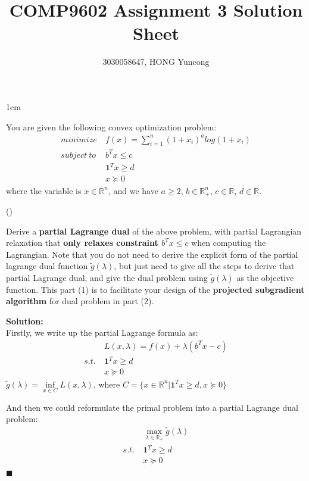 \documentclass{article}
\newcounter{pcounter}                                   %
\newenvironment{problem}                                %
{                                                       %
    \stepcounter{pcounter}                              %
    (\arabic{pcounter})                                 %
}{}                                                     %
\newenvironment{solution}                               %
{\textbf{Solution:} \\}{$\blacksquare$\newline}         %
\newcommand{\domR}{\mathbb{R}}                          %
\newcommand{\vecOne}{\textbf{1}}                        %
\begin{document}
\parindent 0in
\parskip 1em
\title{COMP9602 Assignment 3 Solution Sheet}
\author{3030058647, HONG Yuncong}
\maketitle

You are given the following convex optimization problem:
\begin{align*}
    minimize\ &f(x) = \sum_{i=1}^n (1+x_i)^a log(1+x_i) \\
    subject\ to \ 
        &b^T x \leq c \\
        &\vecOne^T x \geq d \\
        &x \succeq 0
\end{align*}
where the variable is $x \in \domR^n$, and we have $a \geq 2$, $b \in \domR_+^n$, $c \in \domR$, $d \in \domR$.

\begin{problem}
    Derive a \textbf{partial Lagrange dual} of the above problem, with partial Lagrangian relaxation that \textbf{only relaxes constraint $b^T x \leq c$} when computing the Lagrangian. Note that you do not need to derive the explicit form of the partial lagrange dual function $\tilde{g}(\lambda)$, but just need to give all the steps to derive that partial Lagrange dual, and give the dual problem using $\tilde{g}(\lambda)$ as the objective function. This part (1) is to facilitate your design of the \textbf{projected subgradient algorithm} for dual problem in part (2).
\end{problem}

\begin{solution}
    Firstly, we write up the partial Lagrange formula as:
    \begin{align*}
        &L(x, \lambda) = f(x) + \lambda (b^T x - c) \\
        s.t.\ 
            &\vecOne^T x \geq d \\
            &x \succeq 0
    \end{align*}
    $\tilde{g}(\lambda) = \inf\limits_{x \in C} L(x, \lambda)$, where $C = \{x \in \domR^n | \vecOne^T x \geq d, x \succeq 0\}$
    
    And then we could reformulate the primal problem into a partial Lagrange dual problem:
    \begin{align*}
        &\max\limits_{\lambda \in \domR_+} \tilde{g}(\lambda) \\
        s.t.\ 
        &\vecOne^T x \geq d \\
        &x \succeq 0
    \end{align*}
\end{solution}
\end{document}
